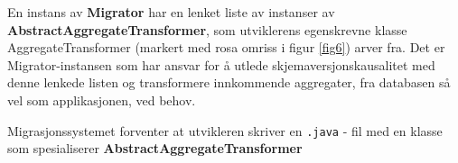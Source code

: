 En instans av \textbf{Migrator} har en lenket liste av instanser av \textbf{AbstractAggregateTransformer}, som utviklerens egenskrevne klasse AggregateTransformer (markert med rosa omriss i figur \ref{fig6}) arver fra. Det er Migrator-instansen som har ansvar for å utlede skjemaversjonskausalitet med denne lenkede listen og transformere innkommende aggregater, fra databasen så vel som applikasjonen, ved behov.









Migrasjonssystemet forventer at utvikleren skriver en \texttt{.java} - fil med en klasse som spesialiserer \textbf{AbstractAggregateTransformer} 

